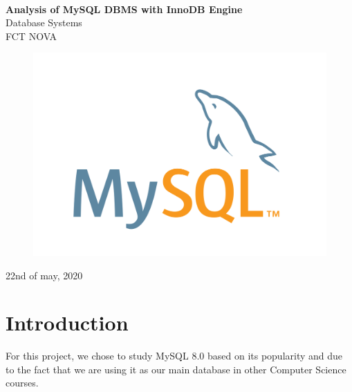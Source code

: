 \documentclass[12pt]{article}
\begin{document}
\begin{titlepage}

\begin{center}

\hspace{0pt}\\

\vspace{1.5cm}
{{\huge\textbf{Analysis of MySQL DBMS with InnoDB Engine}}}\\
\vspace{0.5cm}
{\Large Database Systems}\\[5pt]
{\Large FCT NOVA}\\[4pt]
\vspace{1.5cm}

\begin{figure}[h]
    \centering
    \includegraphics[scale=.17]{files/mysql-logo.png}
\end{figure}

\vspace{5cm}

\vspace{2cm}
{{22nd of may, 2020}}\\

\end{center}
\end{titlepage}

\newpage
\tableofcontents


\newpage
\section{Introduction}
\label{intro}
For this project, we chose to study MySQL 8.0 based on its popularity and due to the fact that we are using it as our main database in other Computer Science courses.
\end{document}
